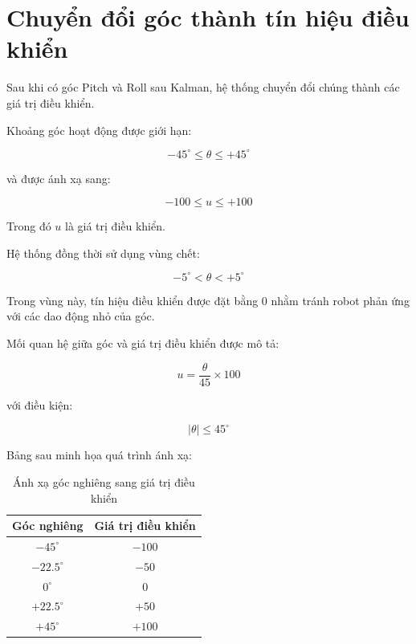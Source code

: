 \documentclass[a4paper,12pt]{report}
\begin{document}

\section{Chuyển đổi góc thành tín hiệu điều khiển}
\label{sec:angle-control}

Sau khi có góc Pitch và Roll sau Kalman, hệ thống chuyển đổi chúng thành các giá trị điều khiển.

Khoảng góc hoạt động được giới hạn:

\begin{equation}
-45^\circ \leq \theta \leq +45^\circ
\end{equation}

và được ánh xạ sang:

\begin{equation}
-100 \leq u \leq +100
\end{equation}

Trong đó $u$ là giá trị điều khiển.

Hệ thống đồng thời sử dụng vùng chết:

\begin{equation}
-5^\circ < \theta < +5^\circ
\end{equation}

Trong vùng này, tín hiệu điều khiển được đặt bằng 0 nhằm tránh robot phản ứng với các dao động nhỏ của góc.

Mối quan hệ giữa góc và giá trị điều khiển được mô tả:

\begin{equation}
u=
\frac{\theta}{45}
\times100
\end{equation}

với điều kiện:

\begin{equation}
|\theta|\leq45^\circ
\end{equation}

Bảng sau minh họa quá trình ánh xạ:

\begin{table}[H]
    \centering
    \caption{Ánh xạ góc nghiêng sang giá trị điều khiển}
    \label{tab:angle-control}
    \begin{tabular}{c c}
        \toprule
        \textbf{Góc nghiêng} & \textbf{Giá trị điều khiển} \\
        \midrule
        $-45^\circ$ & $-100$ \\
        $-22.5^\circ$ & $-50$ \\
        $0^\circ$ & $0$ \\
        $+22.5^\circ$ & $+50$ \\
        $+45^\circ$ & $+100$ \\
        \bottomrule
    \end{tabular}
\end{table}
\end{document}
